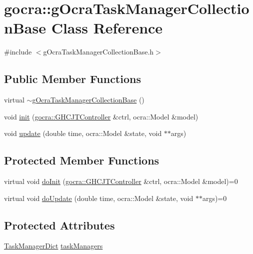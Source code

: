 \hypertarget{classgocra_1_1gOcraTaskManagerCollectionBase}{}\section{gocra\+:\+:g\+Ocra\+Task\+Manager\+Collection\+Base Class Reference}
\label{classgocra_1_1gOcraTaskManagerCollectionBase}


{\ttfamily \#include $<$g\+Ocra\+Task\+Manager\+Collection\+Base.\+h$>$}

\subsection*{Public Member Functions}
\begin{DoxyCompactItemize}
\item 
virtual \hyperlink{classgocra_1_1gOcraTaskManagerCollectionBase_afe4a8d100c2a8aae6263249145a2d941}{$\sim$g\+Ocra\+Task\+Manager\+Collection\+Base} ()
\item 
void \hyperlink{classgocra_1_1gOcraTaskManagerCollectionBase_ae962f18a286bc706ee867eede15822b6}{init} (\hyperlink{classgocra_1_1GHCJTController}{gocra\+::\+G\+H\+C\+J\+T\+Controller} \&ctrl, ocra\+::\+Model \&model)
\item 
void \hyperlink{classgocra_1_1gOcraTaskManagerCollectionBase_a08764673857307135233d7a69ad49a69}{update} (double time, ocra\+::\+Model \&state, void $\ast$$\ast$args)
\end{DoxyCompactItemize}
\subsection*{Protected Member Functions}
\begin{DoxyCompactItemize}
\item 
virtual void \hyperlink{classgocra_1_1gOcraTaskManagerCollectionBase_a81b68fbc3c26897cb4c971bd53199b78}{do\+Init} (\hyperlink{classgocra_1_1GHCJTController}{gocra\+::\+G\+H\+C\+J\+T\+Controller} \&ctrl, ocra\+::\+Model \&model)=0
\item 
virtual void \hyperlink{classgocra_1_1gOcraTaskManagerCollectionBase_a42f29543b66d4ff1e297225e0f5c6501}{do\+Update} (double time, ocra\+::\+Model \&state, void $\ast$$\ast$args)=0
\end{DoxyCompactItemize}
\subsection*{Protected Attributes}
\begin{DoxyCompactItemize}
\item 
\hyperlink{namespacegocra_ad407175473be2e361f2937acf73ca06c}{Task\+Manager\+Dict} \hyperlink{classgocra_1_1gOcraTaskManagerCollectionBase_a247b32be87662be87239195b726fabca}{task\+Managers}
\end{DoxyCompactItemize}


